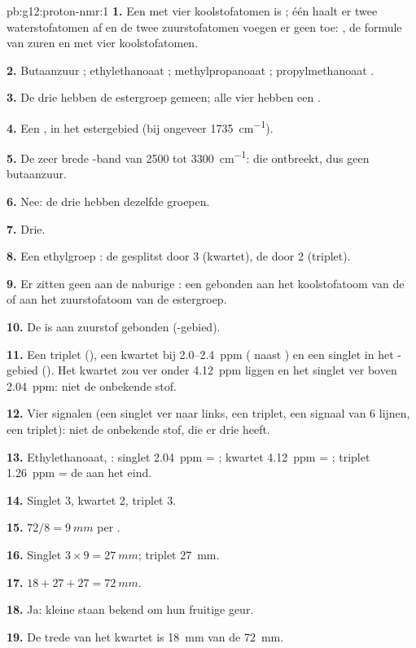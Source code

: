 \begin{solution}{pb:g12:proton-nmr:1}
\textbf{1.} Een  met vier koolstofatomen is ; één
 haalt er twee waterstofatomen af en de twee zuurstofatomen
voegen er geen toe: , de formule van zuren en  met vier
koolstofatomen.

\textbf{2.} Butaanzuur ; ethylethanoaat
; methylpropanoaat ;
propylmethanoaat .

\textbf{3.} De drie  hebben de estergroep gemeen; alle vier hebben
een .

\textbf{4.} Een , in het estergebied (bij ongeveer
\qty{1735}{cm^{-1}}).

\textbf{5.} De zeer brede -band van 2500 tot
\qty{3300}{cm^{-1}}: die ontbreekt, dus geen butaanzuur.

\textbf{6.} Nee: de drie  hebben dezelfde groepen.

\textbf{7.} Drie.

\textbf{8.} Een ethylgroep : de  gesplitst door 3
 (kwartet), de  door 2 (triplet).

\textbf{9.} Er zitten geen  aan de naburige : een
 gebonden aan het koolstofatoom van de  of aan het
zuurstofatoom van de estergroep.

\textbf{10.} De  is aan zuurstof gebonden (-gebied).

\textbf{11.} Een triplet (), een kwartet bij 2.0--\qty{2.4}{ppm}
( naast ) en een singlet in het -gebied
(). Het kwartet zou ver onder \qty{4.12}{ppm} liggen en het
singlet ver boven \qty{2.04}{ppm}: niet de onbekende stof.

\textbf{12.} Vier signalen (een singlet ver naar links, een triplet, een
signaal van 6 lijnen, een triplet): niet de onbekende stof, die er drie
heeft.

\textbf{13.} Ethylethanoaat, : singlet
\qty{2.04}{ppm} = ; kwartet \qty{4.12}{ppm} = ;
triplet \qty{1.26}{ppm} = de  aan het eind.

\textbf{14.} Singlet 3, kwartet 2, triplet 3.

\textbf{15.} $72 / 8 = \qty{9}{mm}$ per .

\textbf{16.} Singlet $3 \times 9 = \qty{27}{mm}$; triplet
\qty{27}{mm}.

\textbf{17.} $18 + 27 + 27 = \qty{72}{mm}$.

\textbf{18.} Ja: kleine  staan bekend om hun fruitige geur.

\textbf{19.} De trede van het kwartet is \qty{18}{mm} van de
\qty{72}{mm}.
\end{solution}
